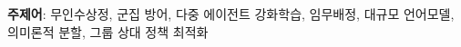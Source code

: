 
\vspace{4pt}
\noindent\textbf{주제어}\;: 무인수상정, 군집 방어, 다중 에이전트 강화학습, 임무배정, 대규모 언어모델, 의미론적 분할, 그룹 상대 정책 최적화

\vspace{10pt}
